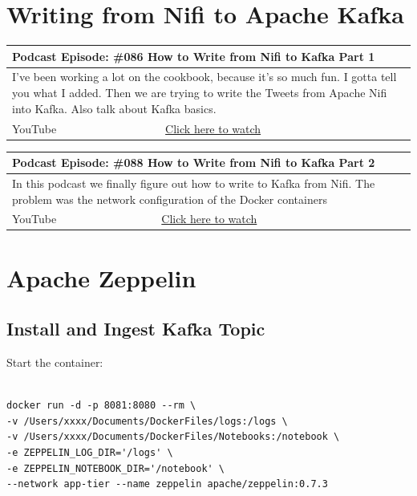 \documentclass[12pt, numbers=noenddot]{scrreprt} %
\begin{document}
\chapter{Writing from Nifi to Apache Kafka}

\begin{table}[h]
\begin{tabular}{ll}
\hline
\multicolumn{2}{l}{\textbf{Podcast Episode:} \#086 How to Write from Nifi to Kafka Part 1} \\ \hline
\multicolumn{2}{p{15cm}}{I've been working a lot on the cookbook, because it's so much fun. I gotta tell you what I added.  Then we are trying to write the Tweets from Apache Nifi into Kafka. Also talk about Kafka basics.}         \\ \hline
\multicolumn{1}{l|}{YouTube}   & \href{https://youtu.be/F7Y-ygnyJMg}{Click here to watch}   \\  \hline
\end{tabular}
\end{table}

\begin{table}[h]
\begin{tabular}{ll}
\hline
\multicolumn{2}{l}{\textbf{Podcast Episode:} \#088 How to Write from Nifi to Kafka Part 2} \\ \hline
\multicolumn{2}{p{15cm}}{In this podcast we finally figure out how to write to Kafka from Nifi. The problem was the network configuration of the Docker containers}         \\ \hline
\multicolumn{1}{l|}{YouTube}   & \href{https://youtu.be/pJbRnBQmoCs}{Click here to watch}   \\ \hline
\end{tabular}
\end{table}


\chapter{Apache Zeppelin}

\section{Install and Ingest Kafka Topic}

Start the container:
\begin{lstlisting}

docker run -d -p 8081:8080 --rm \
-v /Users/xxxx/Documents/DockerFiles/logs:/logs \
-v /Users/xxxx/Documents/DockerFiles/Notebooks:/notebook \
-e ZEPPELIN_LOG_DIR='/logs' \
-e ZEPPELIN_NOTEBOOK_DIR='/notebook' \
--network app-tier --name zeppelin apache/zeppelin:0.7.3
\end{lstlisting}
\end{document}
